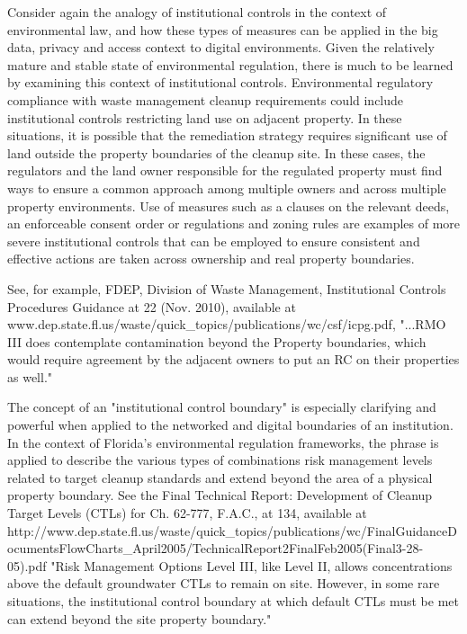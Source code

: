 Consider again the analogy of institutional controls in the context of environmental law, and how these types of measures can be applied in the big data, privacy and access context to digital environments.
Given the relatively mature and stable state of environmental regulation, there is much to be learned by examining this context of institutional controls.
Environmental regulatory compliance with waste management cleanup requirements could include institutional controls restricting land use on adjacent property.
In these situations, it is possible that the remediation strategy requires significant use of land outside the property boundaries of the cleanup site. 
In these cases, the regulators and the land owner responsible for the regulated property must find ways to ensure a common approach among multiple owners and across multiple property environments.
Use of measures such as a clauses on the relevant deeds, an enforceable consent order or regulations and zoning rules are examples of more severe institutional controls that can be employed to ensure consistent and effective actions are taken across ownership and real property boundaries.

See, for example, FDEP, Division of Waste Management, Institutional Controls Procedures Guidance at 22 (Nov. 2010), available at www.dep.state.fl.us/waste/quick\_topics/publications/wc/csf/icpg.pdf, "...RMO III does contemplate contamination beyond the Property boundaries, which would require agreement by the adjacent owners to put an RC on their properties as well."

The concept of an "institutional control boundary" is especially clarifying and powerful when applied to the networked and digital boundaries of an institution.
In the context of Florida's environmental regulation frameworks, the phrase is applied to describe the various types of combinations risk management levels related to target cleanup standards and extend beyond the area of a physical property boundary.
See the Final Technical Report: Development of Cleanup Target Levels (CTLs) for Ch. 62-777, F.A.C., at 134, available at http://www.dep.state.fl.us/waste/quick\_topics/publications/wc/FinalGuidanceDocumentsFlowCharts\_April2005/TechnicalReport2FinalFeb2005(Final3-28-05).pdf "Risk Management Options Level III, like Level II, allows concentrations above the default groundwater CTLs to remain on site.
However, in some rare situations, the institutional control boundary at which default CTLs must be met can extend beyond the site property boundary."

